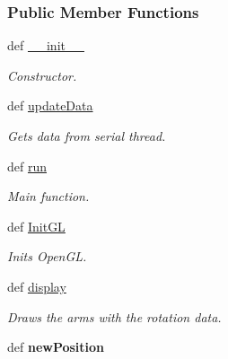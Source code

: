 \subsubsection*{Public Member Functions}
\begin{DoxyCompactItemize}
\item 
def \hyperlink{classcube_1_1_cube_a54d6a19cec851423c02c53f071364184}{\-\_\-\-\_\-init\-\_\-\-\_\-}
\begin{DoxyCompactList}\small\item\em Constructor. \end{DoxyCompactList}\item 
def \hyperlink{classcube_1_1_cube_a7a26b85d9e5c8699bc5e7f58bb92cdb4}{update\-Data}
\begin{DoxyCompactList}\small\item\em Gets data from serial thread. \end{DoxyCompactList}\item 
def \hyperlink{classcube_1_1_cube_a04f16dee59b9ff3ec84a913b96c997e7}{run}
\begin{DoxyCompactList}\small\item\em Main function. \end{DoxyCompactList}\item 
def \hyperlink{classcube_1_1_cube_a06759c5e77eb0aeb358521b686752004}{Init\-G\-L}
\begin{DoxyCompactList}\small\item\em Inits Open\-G\-L. \end{DoxyCompactList}\item 
def \hyperlink{classcube_1_1_cube_a08b569f052645a49639006bf11d78e6a}{display}
\begin{DoxyCompactList}\small\item\em Draws the arms with the rotation data. \end{DoxyCompactList}\item 
\hypertarget{classcube_1_1_cube_a1190ce772ca38f38358b1bad517d29e9}{def {\bfseries new\-Position}}\label{classcube_1_1_cube_a1190ce772ca38f38358b1bad517d29e9}


\end{DoxyCompactItemize}
